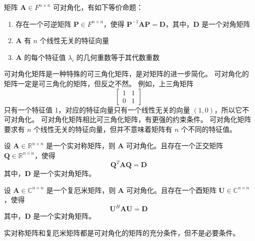 \begin{corollary}[矩阵可对角化的充要条件]
    矩阵 $\mathbf{A}\in F^{n\times n}$ 可对角化，有如下等价命题：
    \begin{enumerate}
        \item 存在一个可逆矩阵 $\mathbf{P} \in F^{n \times n}$，使得 $\mathbf{P}^{-1}\mathbf{A}\mathbf{P} = \mathbf{D}$，其中，$\mathbf{D}$ 是一个对角矩阵
        \item $\mathbf{A}$ 有 $n$ 个线性无关的特征向量
        \item $\mathbf{A}$ 的每个特征值 $\lambda_i$ 的几何重数等于其代数重数
    \end{enumerate}
\end{corollary}

\begin{note}
    可对角化矩阵是一种特殊的可三角化矩阵，是对矩阵的进一步简化。
    可对角化的矩阵一定是可三角化的矩阵，但反之不然。
    例如，上三角矩阵
    \[\begin{bmatrix}
        1 & 1 \\
        0 & 1
    \end{bmatrix}\] 
    只有一个特征值 1，对应的特征向量只有一个线性无关的向量 $(1,0)$，所以它不可对角化。
    可对角化矩阵相比可三角化矩阵，有更强的约束条件。
    可对角化矩阵要求有 $n$ 个线性无关的特征向量，但并不意味着矩阵有 $n$ 个不同的特征值。
\end{note}
\vspace{1em}

\begin{proposition}[实对称矩阵是可对角化的矩阵]
    设 $\mathbf{A} \in \mathbb{R}^{n \times n}$ 是一个实对称矩阵，则 $\mathbf{A}$ 可对角化。且存在一个正交矩阵 $\mathbf{Q} \in \mathbb{R}^{n \times n}$，使得
    \[
        \mathbf{Q}^T \mathbf{A} \mathbf{Q} = \mathbf{D}
    \]
    其中，$\mathbf{D}$ 是一个实对角矩阵。
    \label{prop:real_symmetric_matrix_diagonalizable}
\end{proposition}

\begin{proposition}[复厄米矩阵是可对角化的矩阵]
    设 $\mathbf{A} \in \mathbb{C}^{n \times n}$ 是一个复厄米矩阵，则 $\mathbf{A}$ 可对角化。且存在一个酉矩阵 $\mathbf{U} \in \mathbb{C}^{n \times n}$，使得
    \[
        \mathbf{U}^H \mathbf{A} \mathbf{U} = \mathbf{D}
    \]
    其中，$\mathbf{D}$ 是一个实对角矩阵。
    \label{prop:hermitian_matrix_diagonalizable}
\end{proposition}

\begin{note}
    实对称矩阵和复厄米矩阵都是可对角化的矩阵的充分条件，但不是必要条件。    
\end{note}
\vspace{1em}

